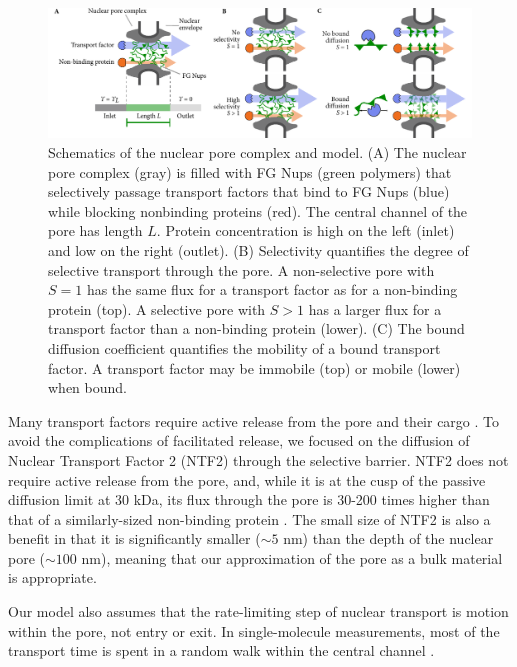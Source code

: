 \begin{figure}[t!]
\centering
\includegraphics[width=17.8cm]{figs/ch02/fig1.pdf}
\caption[Schematics of the nuclear pore complex and model.]{Schematics of the nuclear pore complex and model. (A) The
  nuclear pore complex (gray) is filled with FG Nups (green polymers)
  that selectively passage transport factors that bind to FG Nups
  (blue) while blocking nonbinding proteins (red). The central
  channel of the pore has length $L$. Protein concentration is high on
  the left (inlet) and low on the right (outlet).  (B) Selectivity
  quantifies the degree of selective transport through the pore. A
  non-selective pore with $S=1$ has the same flux for a transport
  factor as for a non-binding protein (top). A selective pore with
  $S>1$ has a larger flux for a transport factor than a non-binding
  protein (lower). (C) The bound diffusion coefficient quantifies the
  mobility of a bound transport factor.  A transport factor may be
  immobile (top) or mobile (lower) when bound. }
\label{fig:cartoon}
\end{figure}

Many transport factors require active release from the pore and their cargo \cite{lowe15, mincer11, gorlich96, gilchrist02}.  To avoid the complications of facilitated release, we focused on the diffusion of Nuclear Transport Factor 2 (NTF2) through the selective barrier.  NTF2 does not require active release from the pore, and, while it is at the cusp of the passive  diffusion limit at 30 kDa, its flux through the pore is 30-200 times higher than that of a similarly-sized non-binding protein \cite{mincer11, zilman07}.  The small size of NTF2 is also a benefit in that it is significantly smaller ($\sim 5$ nm) than the depth of the nuclear pore ($\sim 100$ nm), meaning that our approximation of the pore as a bulk material is appropriate.

Our model also assumes that the rate-limiting step of nuclear transport is motion within the pore, not entry or exit.  In single-molecule measurements, most of the transport time is spent in a random walk within the central channel \cite{yang04, tu13}.

